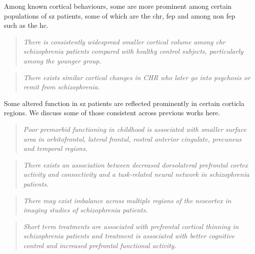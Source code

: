 Among known cortical behaviours, some are more prominent among certain populations of \ac{sz} patients, some of which are the \ac{chr}, \ac{fep} and among non \ac{fep} such as the \ac{hc}.
\begin{quotation}
	\textit{There is consistently widespread smaller cortical volume among \ac{chr} schizophrenia patients compared with healthy control subjects, particularly among the younger group.}
	\begin{flushright}
		\cite{chung2019cortical}
	\end{flushright}
\end{quotation}
\begin{quotation}
	\textit{There exists similar cortical changes in CHR who later go into psychosis or remit from schizophrenia.}
	\begin{flushright}
		\cite{chung2019cortical}
	\end{flushright}
\end{quotation}
Some altered function in \ac{sz} patients are reflected prominently in certain corticla regions. We discuss some of those consistent across previous works here.
\begin{quotation}
	\textit{Poor premorbid functioning in childhood is associated with smaller surface area in orbitofrontal, lateral frontal, rostral anterior cingulate, precuneus and temporal regions.}
	\begin{flushright}
		\cite{chung2019cortical}
	\end{flushright}
\end{quotation}
\begin{quotation}
	\textit{There exists an association between decreased dorsolateral prefrontal cortex activity and connectivity and a task-related neural network in schizophrenia patients.}
	\begin{flushright}
		\cite{yoon2008association}
	\end{flushright}
\end{quotation}
\begin{quotation}
	\textit{There may exist imbalance across multiple regions of the neocortex in imaging studies of schizophrenia patients. }
	\begin{flushright}
		\cite{rolls2021attractor}
	\end{flushright}
\end{quotation}
\begin{quotation}
	\textit{Short term treatments are associated with prefrontal cortical thinning in schizophrenia patients and treatment is associated with better cognitive control and increased prefrontal functional activity.}
	\begin{flushright}
		\cite{lesh2015multimodal}
	\end{flushright}
\end{quotation}
